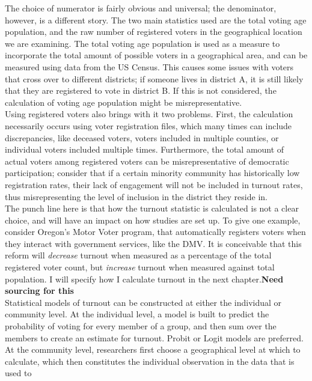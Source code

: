\documentclass[12pt,twoside]{reedthesis}
\begin{document}
  The choice of numerator is fairly obvious and universal; the
  denominator, however, is a different story. The two main statistics used
  are the total voting age population, and the raw number of registered
  voters in the geographical location we are examining. The total voting
  age population is used as a measure to incorporate the total amount of
  possible voters in a geographical area, and can be measured using data
  from the US Census. This causes some issues with voters that cross over
  to different districts; if someone lives in district A, it is still
  likely that they are registered to vote in district B. If this is not
  considered, the calculation of voting age population might be
  misrepresentative.\\
  Using registered voters also brings with it two problems. First, the
  calculation necessarily occurs using voter registration files, which
  many times can include discrepancies, like deceased voters, voters
  included in multiple counties, or individual voters included multiple
  times. Furthermore, the total amount of actual voters among registered
  voters can be misrepresentative of democratic participation; consider
  that if a certain minority community has historically low registration
  rates, their lack of engagement will not be included in turnout rates,
  thus misrepresenting the level of inclusion in the district they reside
  in.\\
  The punch line here is that how the turnout statistic is calculated is
  not a clear choice, and will have an impact on how studies are set up.
  To give one example, consider Oregon's Motor Voter program, that
  automatically registers voters when they interact with government
  services, like the DMV. It is conceivable that this reform will
  \emph{decrease} turnout when measured as a percentage of the total
  registered voter count, but \emph{increase} turnout when measured
  against total population. I will specify how I calculate turnout in the
  next chapter.\textbf{Need sourcing for this}\\
  Statistical models of turnout can be constructed at either the
  individual or community level. At the individual level, a model is built
  to predict the probability of voting for every member of a group, and
  then sum over the members to create an estimate for turnout. Probit or
  Logit models are preferred. At the community level, researchers first
  choose a geographical level at which to calculate, which then
  constitutes the individual observation in the data that is used to
\end{document}
